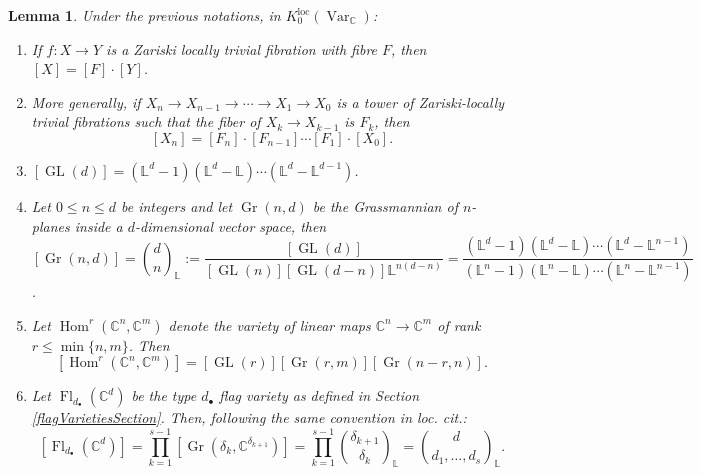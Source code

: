 \documentclass{amsart}
\theoremstyle{plain}
\newtheorem{lemma}[theorem]{Lemma}
\numberwithin{equation}{section}
\theoremstyle{definition}
\theoremstyle{remark}
\begin{document}
	\begin{lemma}\label{computationsMotivicClasses}
		Under the previous notations, in $K_0^{\operatorname{loc}}(\operatorname{Var}_{\mathbb{C}})$:
		\begin{enumerate}
			\item If $f:X\to Y$ is a Zariski locally trivial fibration with fibre $F$, then $[X]=[F]\cdot [Y]$. 
			\item More generally, if $X_n\to X_{n-1}\to \cdots\to X_1\to X_0$ is a tower of Zariski-locally trivial fibrations such that the fiber of $X_{k}\to X_{k-1}$ is $F_k$, then 
			$$
			[X_n]=[F_n]\cdot [F_{n-1}] \cdots[F_1]\cdot[X_0].
			$$
			\item $[\operatorname{GL}(d)]= (\mathbb{L}^{d}-1)(\mathbb{L}^d-\mathbb{L})\cdots (\mathbb{L}^d-\mathbb{L}^{d-1})$.
			\item Let $0\leq n\leq d$ be integers and let $\operatorname{Gr}(n,d)$ be the Grassmannian of $n$-planes inside a $d$-dimensional vector space, then 
			$$[\operatorname{Gr}(n,d)]={d\choose n}_{\mathbb{L}}:=\frac{[\operatorname{GL}(d)]}{[\operatorname{GL}(n)][\operatorname{GL}(d-n)]\mathbb{L}^{n(d-n)}}=\frac{(\mathbb{L}^d-1)(\mathbb{L}^d-\mathbb{L})\cdots(\mathbb{L}^{d}-\mathbb{L}^{n-1})}{(\mathbb{L}^{n}-1)(\mathbb{L}^n-\mathbb{L})\cdots (\mathbb{L}^n-\mathbb{L}^{n-1})}$$.
			\item Let $\operatorname{Hom}^r(\mathbb{C}^n,\mathbb{C}^m)$ denote the variety of linear maps $\mathbb{C}^{n}\to \mathbb{C}^{m}$ of rank $r\leq \min\{n,m\}$. Then $$[\operatorname{Hom}^r(\mathbb{C}^n,\mathbb{C}^m)]=[\operatorname{GL}(r)][\operatorname{Gr}(r,m)][\operatorname{Gr}(n-r,n)].$$
			\item Let $\operatorname{Fl}_{d_\bullet}(\mathbb{C}^d)$ be the type $d_\bullet$ flag variety as defined in Section \ref{flagVarietiesSection}. Then, following the same convention in loc. cit.: 
			$$
			[\operatorname{Fl}_{d_\bullet}(\mathbb{C}^d)]=\prod_{k=1}^{s-1}[\operatorname{Gr}(\delta_k,\mathbb{C}^{\delta_{k+1}})]=\prod_{k=1}^{s-1}{\delta_{k+1}\choose\delta_k}_{\mathbb{L}}={d\choose d_1,\ldots,d_s}_{\mathbb{L}}.
			$$ 
		\end{enumerate}
	\end{lemma}
\end{document}
